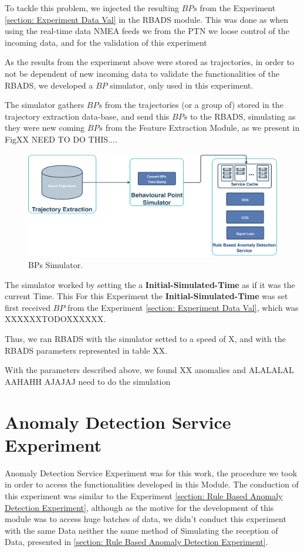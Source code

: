 To tackle this problem, we injected the resulting $BPs$ from the Experiment \ref{section: Experiment Data Val} in the RBADS module. This was done as when using the real-time data NMEA feeds we from the PTN we loose control of the incoming data, and for the validation of this experiment 

As the results from the experiment above were stored as trajectories, in order to not be dependent of new incoming data to validate the functionalities of the RBADS, we developed a $BP$ simulator, only used in this experiment.

The simulator gathers $BPs$ from the trajectories (or a group of) stored in the trajectory extraction data-base, and send this $BPs$ to the RBADS, simulating as they were new coming $BPs$ from the Feature Extraction Module, as we present in FigXX NEED TO DO THIS....

\begin{figure}[H]
	\centering
	\includegraphics[scale = .3]{figures/Ch5/SRM-Exp-Simulator.pdf}
    \caption{BPs Simulator.}
    \label{fig: 5 BPs Simulator}
\end{figure}



The simulator worked by setting the a \textbf{Initial-Simulated-Time} as if it was the current Time. This 
For this Experiment the \textbf{Initial-Simulated-Time} was set first received $BP$ from the Experiment \ref{section: Experiment Data Val}, which was XXXXXXTODOXXXXXX.

Thus, we ran RBADS with the simulator setted to a speed of X, and with the RBADS parameters represented in table XX.


With the parameters described above, we found XX anomalies and ALALALAL AAHAHH AJAJAJ need to do the simulation

\section{Anomaly Detection Service Experiment}
Anomaly Detection Service Experiment was for this work, the procedure we took in order to access the functionalities developed in this Module. The conduction of this experiment was similar to the Experiment \ref{section: Rule Based Anomaly Detection Experiment}, although as the motive for the development of this module was to access huge batches of data, we didn't conduct this experiment with the same Data neither the same method of Simulating the reception of Data, presented in \ref{section: Rule Based Anomaly Detection Experiment}.


